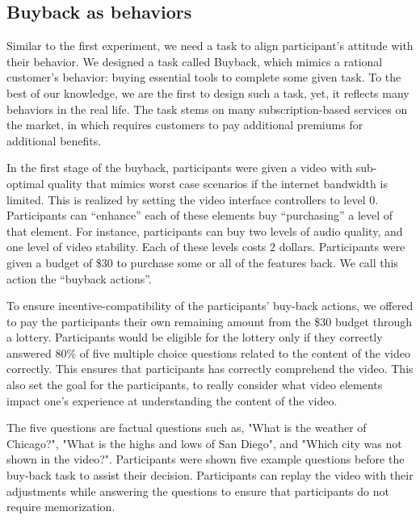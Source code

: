 \subsection{Buyback as behaviors}
Similar to the first experiment,
we need a task to align participant's attitude
with their behavior.
We designed a task called Buyback, 
which mimics a rational customer's behavior: 
buying essential tools to complete some given task.
To the best of our knowledge,
we are the first to design such a task,
yet, it reflects many behaviors
in the real life.
The task stems on 
many subscription-based services on the market,
in which requires customers to pay additional premiums
for additional benefits.

In the first stage of the buyback,
participants were given 
a video with sub-optimal quality
that mimics worst case scenarios
if the internet bandwidth is limited.
This is realized by 
setting the video interface controllers 
to level 0.
Participants can ``enhance'' each of these elements
buy ``purchasing'' a level of that element.
For instance, 
participants can buy two levels of audio quality,
and one level of video stability.
Each of these levels costs $2$ dollars.
Participants were given a budget of \$30 
to purchase some or all of the features back.
We call this action the ``buyback actions''.

To ensure incentive-compatibility 
of the participants' buy-back actions, 
we offered to pay the participants their own remaining amount 
from the \$30 budget through a lottery.
Participants would be eligible for the lottery 
only if they correctly answered 80\% of 
five multiple choice questions 
related to the content of the video correctly.
This ensures that participants has
correctly comprehend the video.
This also set the goal for the participants,
to really consider what video elements
impact one's experience at understanding
the content of the video.

The five questions are factual questions such as, 
"What is the weather of Chicago?", 
"What is the highs and lows of San Diego", and
"Which city was not shown in the video?". 
Participants were shown five example questions 
before the buy-back task to assist their decision.
Participants can replay the video with their adjustments
while answering the questions
to ensure that participants do not require memorization.\par


